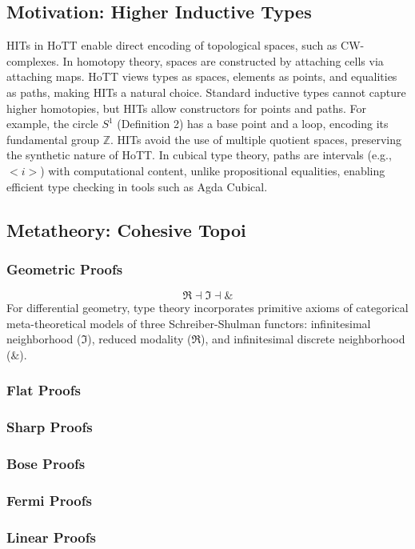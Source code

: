 \documentclass{article}
\begin{document}
\subsection{Motivation: Higher Inductive Types}
HITs in HoTT enable direct encoding of topological spaces, such as
CW-complexes. In homotopy theory, spaces are constructed by attaching
cells via attaching maps. HoTT views types as spaces, elements
as points, and equalities as paths, making HITs a natural choice.
Standard inductive types cannot capture higher homotopies, but
HITs allow constructors for points and paths. For example, the circle \( S^1 \) (Definition 2) has a base point and a loop, encoding its
fundamental group \( \mathbb{Z} \). HITs avoid the use of multiple
quotient spaces, preserving the synthetic nature of HoTT. In cubical type theory, paths are
intervals (e.g., \( <i> \)) with computational content, unlike
propositional equalities, enabling efficient type checking in tools
such as Agda Cubical.

\subsection{Metatheory: Cohesive Topoi}

\subsubsection{Geometric Proofs}
$$
\Re \dashv \Im \dashv \&
$$
For differential geometry, type theory incorporates primitive axioms of
categorical meta-theoretical models of three Schreiber-Shulman functors:
infinitesimal neighborhood (\(\Im\)), reduced modality (\(\Re\)), and
infinitesimal discrete neighborhood (\(\&\)).

\subsubsection{Flat Proofs}
\subsubsection{Sharp Proofs}
\subsubsection{Bose Proofs}
\subsubsection{Fermi Proofs}
\subsubsection{Linear Proofs}
\end{document}
